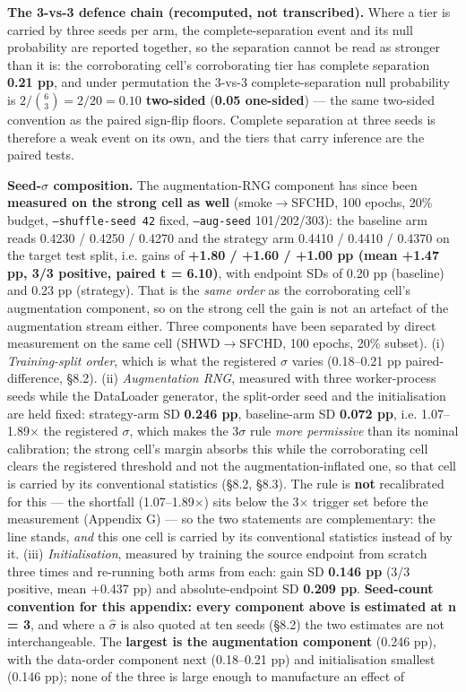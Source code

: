 \documentclass[pdflatex,sn-mathphys-ay]{sn-jnl}
\begin{document}
\textbf{The 3-vs-3 defence chain (recomputed, not transcribed).} Where a tier is carried by three seeds per arm, the complete-separation event and its null probability are reported together, so the separation cannot be read as stronger than it is: the corroborating cell's corroborating tier has complete separation \textbf{0.21 pp}, and under permutation the 3-vs-3 complete-separation null probability is \textbf{$2/\binom{6}{3}=2/20=0.10$ two-sided} (\textbf{0.05 one-sided}) --- the same two-sided convention as the paired sign-flip floors. Complete separation at three seeds is therefore a weak event on its own, and the tiers that carry inference are the paired tests.

\textbf{Seed-\ensuremath{\sigma} composition.} The augmentation-RNG component has since been \textbf{measured on the strong cell as well} (smoke\ensuremath{\rightarrow}SFCHD, 100 epochs, 20\% budget, \texttt{--shuffle-seed 42} fixed, \texttt{--aug-seed} 101/202/303): the baseline arm reads 0.4230 / 0.4250 / 0.4270 and the strategy arm 0.4410 / 0.4410 / 0.4370 on the target test split, i.e. gains of \textbf{+1.80 / +1.60 / +1.00 pp (mean +1.47 pp, 3/3 positive, paired t = 6.10)}, with endpoint SDs of 0.20 pp (baseline) and 0.23 pp (strategy). That is the \emph{same order} as the corroborating cell's augmentation component, so on the strong cell the gain is not an artefact of the augmentation stream either. Three components have been separated by direct measurement on the same cell (SHWD\ensuremath{\rightarrow}SFCHD, 100 epochs, 20\% subset). (i) \emph{Training-split order}, which is what the registered \ensuremath{\sigma} varies (0.18--0.21 pp paired-difference, \S{}8.2). (ii) \emph{Augmentation RNG}, measured with three worker-process seeds while the DataLoader generator, the split-order seed and the initialisation are held fixed: strategy-arm SD \textbf{0.246 pp}, baseline-arm SD \textbf{0.072 pp}, i.e. 1.07--1.89\ensuremath{\times} the registered \ensuremath{\sigma}, which makes the 3\ensuremath{\sigma} rule \emph{more permissive} than its nominal calibration; the strong cell's margin absorbs this while the corroborating cell clears the registered threshold and not the augmentation-inflated one, so that cell is carried by its conventional statistics (\S{}8.2, \S{}8.3). The rule is \textbf{not} recalibrated for this --- the shortfall (1.07--1.89\ensuremath{\times}) sits below the 3\ensuremath{\times} trigger set before the measurement (Appendix G) --- so the two statements are complementary: the line stands, \emph{and} this one cell is carried by its conventional statistics instead of by it. (iii) \emph{Initialisation}, measured by training the source endpoint from scratch three times and re-running both arms from each: gain SD \textbf{0.146 pp} (3/3 positive, mean +0.437 pp) and absolute-endpoint SD \textbf{0.209 pp}. \textbf{Seed-count convention for this appendix: every component above is estimated at n = 3}, and where a $\hat{\sigma}$ is also quoted at ten seeds (\S{}8.2) the two estimates are not interchangeable. The \textbf{largest is the augmentation component} (0.246 pp), with the data-order component next (0.18--0.21 pp) and initialisation smallest (0.146 pp); none of the three is large enough to manufacture an effect of 
\end{document}
